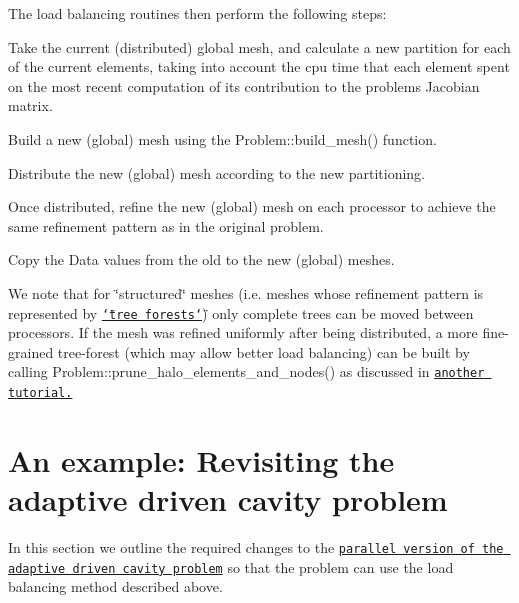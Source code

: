 The load balancing routines then perform the following steps\+:
\begin{DoxyEnumerate}
\item Take the current (distributed) global mesh, and calculate a new partition for each of the current elements, taking into account the cpu time that each element spent on the most recent computation of its contribution to the problem\textquotesingle{}s Jacobian matrix. ~\newline
~\newline

\item Build a new (global) mesh using the {\ttfamily Problem\+::build\+\_\+mesh()} function. ~\newline
~\newline

\item Distribute the new (global) mesh according to the new partitioning. ~\newline
~\newline

\item Once distributed, refine the new (global) mesh on each processor to achieve the same refinement pattern as in the original problem. ~\newline
~\newline

\item Copy the {\ttfamily Data} values from the old to the new (global) meshes. ~\newline
~\newline

\end{DoxyEnumerate}We note that for \char`\"{}structured\char`\"{} meshes (i.\+e. meshes whose refinement pattern is represented by \href{../../../the_data_structure/html/index.html#RefineableQuadMesh_setup_section}{\tt \char`\"{}tree forests\char`\"{}}) only complete trees can be moved between processors. If the mesh was refined uniformly after being distributed, a more fine-\/grained tree-\/forest (which may allow better load balancing) can be built by calling {\ttfamily Problem\+::prune\+\_\+halo\+\_\+elements\+\_\+and\+\_\+nodes()} as discussed in \href{../../../mpi/general_mpi/html/index.html#how_it_works}{\tt another tutorial.} 

\hypertarget{index_example}{}\section{An example\+: Revisiting the adaptive driven cavity problem}\label{index_example}
In this section we outline the required changes to the \href{../../adaptive_driven_cavity/html/index.html}{\tt parallel version of the adaptive driven cavity problem} so that the problem can use the load balancing method described above.

